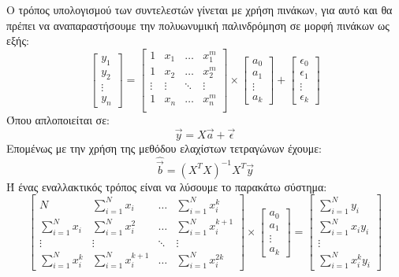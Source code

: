 Ο τρόπος υπολογισμού των συντελεστών γίνεται με χρήση πινάκων, για αυτό και θα πρέπει
να αναπαραστήσουμε την πολυωνυμική παλινδρόμηση σε μορφή πινάκων ως εξής:
$$
\begin{bmatrix}
    y_1  \\
    y_2 \\
    \vdots \\
    y_n
\end{bmatrix}
=
\begin{bmatrix}
    1       & x_1    & \dots     & x_1^m \\
    1       & x_2    & \dots     & x_2^m \\
    \vdots  & \vdots    & \ddots    & \vdots \\
    1       & x_n    & \dots     & x_n^m \\
\end{bmatrix}
\times
\begin{bmatrix}
    a_0 \\
    a_1 \\
    \vdots \\
    a_k
\end{bmatrix}
+
\begin{bmatrix}
    \epsilon_0 \\
    \epsilon_1 \\
    \vdots \\
    \epsilon_k
\end{bmatrix}
$$
Όπου απλοποιείται σε:
$$\overrightarrow{y}=X\overrightarrow{a}+\overrightarrow{\epsilon}$$
Επομένως με την χρήση της μεθόδου ελαχίστων τετραγώνων έχουμε:
$$\widehat{\overrightarrow{b}}=(X^TX)^{-1}X^T\overrightarrow{y}$$
Ή ένας εναλλακτικός τρόπος είναι να λύσουμε το παρακάτω σύστημα:
$$
\begin{bmatrix}
    N       & \sum\limits_{i=1}^Nx_i    & \dots     & \sum\limits_{i=1}^Nx_i^k \\
    \sum\limits_{i=1}^Nx_i   & \sum\limits_{i=1}^Nx_i^2       & \dots     & \sum\limits_{i=1}^Nx_i^{k+1} \\
    \vdots  & \vdots    & \ddots    & \vdots \\
    \sum\limits_{i=1}^Nx_i^k   & \sum\limits_{i=1}^Nx_i^{k+1}    & \dots     & \sum\limits_{i=1}^Nx_i^{2k}
\end{bmatrix}
\times
\begin{bmatrix}
    a_0 \\
    a_1 \\
    \vdots \\
    a_k
\end{bmatrix}
=
\begin{bmatrix}
    \sum\limits_{i=1}^Ny_i  \\
    \sum\limits_{i=1}^Nx_iy_i \\
    \vdots \\
    \sum\limits_{i=1}^Nx_i^ky_i
\end{bmatrix}
$$
